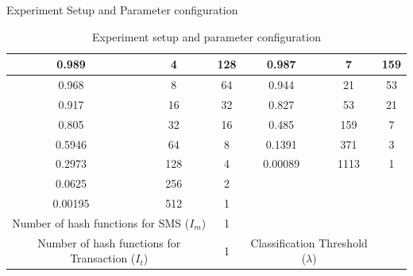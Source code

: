 \documentclass[11pt,aspectratio=169]{beamer}
\begin{document}
\begin{frame}{ Experiment Setup and Parameter configuration}
\begin{table}
\begin{center}
{\begin{tabular}{|c|c|c|c|c|c|c|c|}
		   				\hline 
		   				\multicolumn{1}{|c|}{0.989} & \multicolumn{1}{|c|}{4} & \multicolumn{2}{|c|}{128} & \multicolumn{1}{|c|}{0.987} & \multicolumn{1}{|c|}{7} & \multicolumn{2}{|c|}{159} \\
		   			
		   				\hline 
		   				\multicolumn{1}{|c|}{0.968} &\multicolumn{1}{|c|}{8} & \multicolumn{2}{|c|}{64} & \multicolumn{1}{|c|}{0.944} &\multicolumn{1}{|c|}{21} & \multicolumn{2}{|c|}{53} \\
		   				
		   				\hline 
		   				\multicolumn{1}{|c|}{0.917} &\multicolumn{1}{|c|}{16} & \multicolumn{2}{|c|}{32} & \multicolumn{1}{|c|}{0.827} &\multicolumn{1}{|c|}{53} & \multicolumn{2}{|c|}{21} \\
		   				
		   				\hline 
		   				\multicolumn{1}{|c|}{0.805} &\multicolumn{1}{|c|}{32} & \multicolumn{2}{|c|}{16} & \multicolumn{1}{|c|}{0.485} &\multicolumn{1}{|c|}{159} & \multicolumn{2}{|c|}{7} \\
		   				\hline
		   				
		   				\multicolumn{1}{|c|}{0.5946} &\multicolumn{1}{|c|}{64} & \multicolumn{2}{|c|}{8} & \multicolumn{1}{|c|}{0.1391} &\multicolumn{1}{|c|}{371} & \multicolumn{2}{|c|}{3} \\
		   				\hline
		   			
		   				\multicolumn{1}{|c|}{0.2973} &\multicolumn{1}{|c|}{128} & \multicolumn{2}{|c|}{4} & \multicolumn{1}{|c|}{0.00089} &\multicolumn{1}{|c|}{1113} & \multicolumn{2}{|c|}{1} \\
		   				\hline
		   			
		   				\multicolumn{1}{|c|}{0.0625} &\multicolumn{1}{|c|}{256} & \multicolumn{2}{|c|}{2} & \multicolumn{1}{|c|}{} &\multicolumn{1}{|c|}{} & \multicolumn{2}{|c|}{} \\
		   				\hline
		   			 
		   				\multicolumn{1}{|c|}{0.00195} &\multicolumn{1}{|c|}{512} & \multicolumn{2}{|c|}{1} & \multicolumn{1}{|c|}{} &\multicolumn{1}{|c|}{} & \multicolumn{2}{|c|}{} \\
		   				\hline
		   				
		   				\multicolumn{2}{|c|}{Number of hash functions for SMS (${I_m}$)} & \multicolumn{2}{|c|}{1} & \multicolumn{2}{|c|}{} & \multicolumn{2}{|c|}{} \\
		   				\hline
		   				
		   				\multicolumn{2}{|c|}{Number of hash functions for Transaction (${I_t}$)} & \multicolumn{2}{|c|}{1} & \multicolumn{2}{|c|}{Classification Threshold (${\lambda}$)} & \multicolumn{2}{|c|}{} \\
		   				\hline
		   			\end{tabular}
		   		}
		   	\end{center}
		   	\caption{Experiment setup and parameter configuration}
		   	\label{table 1}
		   	\end{table}
		\end{frame}
		
\end{document}
